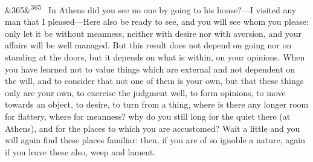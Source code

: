 \documentclass[12pt]{article}
\newcommand{\para}[1][]{\par\noindent\ifx&#1&\else\textsuperscript{\footnotesize #1}~\fi}
\begin{document}
\para[365] In Athens did you see no one by going to his house?—I visited any man that I pleased—Here also be ready to see, and you will see whom you please: only let it be without meanness, neither with desire nor with aversion, and your affairs will be well managed. But this result does not depend on going nor on standing at the doors, but it depends on what is within, on your opinions. When you have learned not to value things which are external and not dependent on the will, and to consider that not one of them is your own, but that these things only are your own, to exercise the judgment well, to form opinions, to move towards an object, to desire, to turn from a thing, where is there any longer room for flattery, where for meanness? why do you still long for the quiet there (at Athens), and for the places to which you are accustomed? Wait a little and you will again find these places familiar: then, if you are of so ignoble a nature, again if you leave these also, weep and lament.
\end{document}
